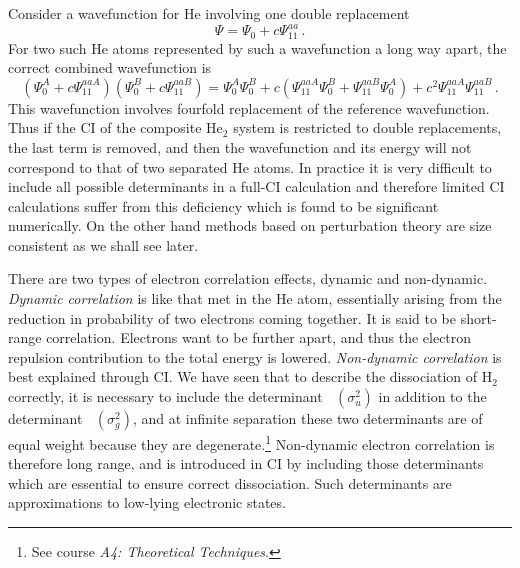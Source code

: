 \documentclass{article}
\theoremstyle{plain}\theoremheaderfont{\normalfont\itshape}\theorembodyfont{\rmfamily}\theoremseparator{.}\newtheorem*{rem}{Remark}\newtheorem*{ex}{Example}\newtheorem*{proof}{Proof}\newtheorem*{altp}{Alternative proof}
\theoremstyle{plain}\theoremheaderfont{\normalfont\bfseries}\theorembodyfont{\rmfamily}\theoremseparator{.}\newtheorem{thm}{Theorem}[section]\newtheorem{lem}[thm]{Lemma}\newtheorem{prop}[thm]{Proposition}\newtheorem*{cor}{Corollary}\newtheorem{defn}[thm]{Definition}\newtheorem{clm}[thm]{Claim}\newtheorem{clminproof}{Claim}
\theoremstyle{break}\theoremheaderfont{\normalfont\itshape}\theorembodyfont{\rmfamily}\theoremseparator{.\medskip}\newtheorem*{proofskip}{Proof}\newtheorem*{exs}{Examples}\newtheorem*{rems}{Remarks}
\theoremstyle{break}\theoremheaderfont{\normalfont\bfseries}\theorembodyfont{\rmfamily}\theoremseparator{.\medskip}\newtheorem{lemskip}[thm]{Lemma}\newtheorem{defnskip}[thm]{Definition}\newtheorem{propskip}[thm]{Proposition}\newtheorem{thmskip}[thm]{Theorem}
\numberwithin{equation}{section}
\DeclareMathOperator{\antisymm}{\hat{\mathcal{A}}}
\begin{document}
    Consider a wavefunction for He involving one double replacement
    \begin{equation}
        \Psi=\Psi_0+c\Psi_{11}^{aa}\,.
    \end{equation}
    For two such He atoms represented by such a wavefunction a long way apart, the correct combined wavefunction is
    \begin{equation}
        (\Psi_{0}^{A}+c\Psi_{11}^{aaA})(\Psi_{0}^{B}+c\Psi_{11}^{aaB})=\Psi_{0}^{A}\Psi_{0}^{B}+c(\Psi_{11}^{aaA}\Psi_{0}^{B}+\Psi_{11}^{aaB}\Psi_{0}^{A})+c^2\Psi_{11}^{aaA}\Psi_{11}^{aaB}\,.
    \end{equation}
    This wavefunction involves fourfold replacement of the reference wavefunction. Thus if the CI of the composite \(\mathrm{He_2}\) system is restricted to double replacements, the last term is removed, and then the wavefunction and its energy will not correspond to that of two separated He atoms. In practice it is very difficult to include all possible determinants in a full-CI calculation and therefore limited CI calculations suffer from this deficiency which is found to be significant numerically. On the other hand methods based on perturbation theory are size consistent as we shall see later.

    There are two types of electron correlation effects, dynamic and non-dynamic. \textit{Dynamic correlation} is like that met in the He atom, essentially arising from the reduction in probability of two electrons coming together. It is said to be short-range correlation. Electrons want to be further apart, and thus the electron repulsion contribution to the total energy is lowered. \textit{Non-dynamic correlation} is best explained through CI. We have seen that to describe the dissociation of H\(_{2}\) correctly, it is necessary to include the determinant \(\antisymm(\sigma_u^2)\) in addition to the determinant \(\antisymm(\sigma_g^2)\), and at infinite separation these two determinants are of equal weight because they are degenerate.\footnote{See course \textit{A4: Theoretical Techniques}.} Non-dynamic electron correlation is therefore long range, and is introduced in CI by including those determinants which are essential to ensure correct dissociation. Such determinants are approximations to low-lying electronic states.
\end{document}
